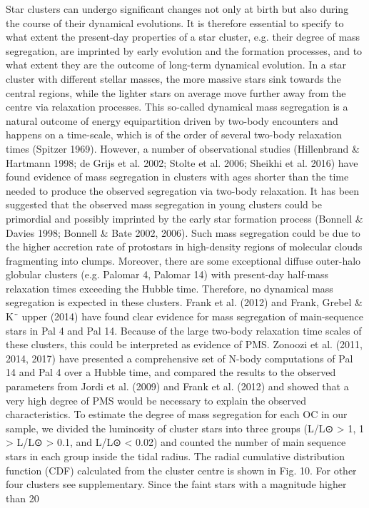 \documentclass[../Main.tex]{subfiles}
\begin{document}
{Star clusters can undergo significant changes not only at birth but
also during the course of their dynamical evolutions. It is therefore
essential to specify to what extent the present-day properties of a star
cluster, e.g. their degree of mass segregation, are imprinted by early
evolution and the formation processes, and to what extent they are
the outcome of long-term dynamical evolution.
In a star cluster with different stellar masses, the more massive
stars sink towards the central regions, while the lighter stars on
average move further away from the centre via relaxation processes.
This so-called dynamical mass segregation is a natural outcome of
energy equipartition driven by two-body encounters and happens on
a time-scale, which is of the order of several two-body relaxation
times (Spitzer 1969).
However, a number of observational studies (Hillenbrand \&
Hartmann 1998; de Grijs et al. 2002; Stolte et al. 2006; Sheikhi et al.
2016) have found evidence of mass segregation in clusters with ages
shorter than the time needed to produce the observed segregation via
two-body relaxation.
It has been suggested that the observed mass segregation in young
clusters could be primordial and possibly imprinted by the early star
formation process (Bonnell \& Davies 1998; Bonnell \& Bate 2002,
2006).
Such mass segregation could be due to the higher accretion rate of
protostars in high-density regions of molecular clouds fragmenting
into clumps.
Moreover, there are some exceptional diffuse outer-halo globular
clusters (e.g. Palomar 4, Palomar 14) with present-day half-mass
relaxation times exceeding the Hubble time. Therefore, no dynamical
mass segregation is expected in these clusters. Frank et al. (2012) and
Frank, Grebel \& K¨
upper (2014) have found clear evidence for mass
segregation of main-sequence stars in Pal 4 and Pal 14. Because of
the large two-body relaxation time scales of these clusters, this could
be interpreted as evidence of PMS. Zonoozi et al. (2011, 2014, 2017)
have presented a comprehensive set of N-body computations of Pal
14 and Pal 4 over a Hubble time, and compared the results to the
observed parameters from Jordi et al. (2009) and Frank et al. (2012)
and showed that a very high degree of PMS would be necessary to
explain the observed characteristics.
To estimate the degree of mass segregation for each OC in our
sample, we divided the luminosity of cluster stars into three groups
(L/L⊙ > 1, 1 > L/L⊙ > 0.1, and L/L⊙ < 0.02) and counted the
number of main sequence stars in each group inside the tidal radius.
The radial cumulative distribution function (CDF) calculated from
the cluster centre is shown in Fig. 10. For other four clusters see
supplementary. Since the faint stars with a magnitude higher than 20

}
\end{document}
